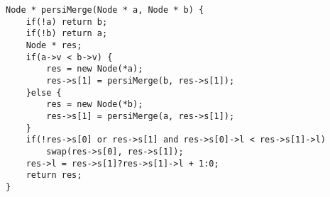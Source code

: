 \begin{lstlisting}
Node * persiMerge(Node * a, Node * b) {
	if(!a) return b;
	if(!b) return a;
	Node * res;
	if(a->v < b->v) {
		res = new Node(*a);
		res->s[1] = persiMerge(b, res->s[1]);
	}else {
		res = new Node(*b);
		res->s[1] = persiMerge(a, res->s[1]);
	}
	if(!res->s[0] or res->s[1] and res->s[0]->l < res->s[1]->l)
		swap(res->s[0], res->s[1]);
	res->l = res->s[1]?res->s[1]->l + 1:0;
	return res;
}
\end{lstlisting}
